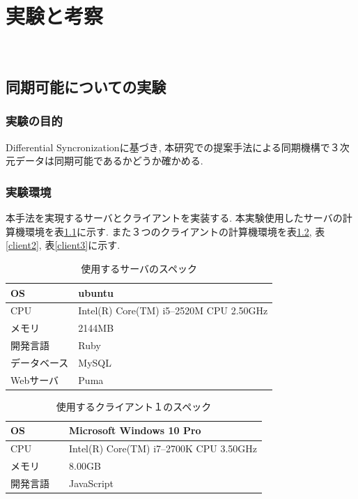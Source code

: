 \chapter{実験と考察}　\label{chap:test}
\section{同期可能についての実験}
\subsection{実験の目的}
Differential Syncronizationに基づき, 本研究での提案手法による同期機構で３次元データは同期可能であるかどうか確かめる.
\subsection{実験環境}
本手法を実現するサーバとクライアントを実装する. 本実験使用したサーバの計算機環境を表\ref{server}に示す. また３つのクライアントの計算機環境を表\ref{client1}, 表\ref{client2}, 表\ref{client3}に示す.
\begin{table}[htbp]
\begin{center}
	\caption{使用するサーバのスペック}
	\begin{tabular}{|l|l|} \hline
		OS & ubuntu \\ \hline
		CPU &  Intel(R) Core(TM) i5--2520M CPU 2.50GHz\\ \hline
		メモリ & 2144MB \\ \hline
    開発言語　& Ruby \\ \hline
		データベース & MySQL \\ \hline
		Webサーバ & Puma\\ \hline
	\end{tabular}
	\label{server}
\end{center}
\end{table}

\begin{table}[htbp]
\begin{center}
	\caption{使用するクライアント１のスペック}
	\begin{tabular}{|l|l|} \hline
		OS & Microsoft Windows 10 Pro \\ \hline
		CPU & Intel(R) Core(TM) i7--2700K CPU 3.50GHz \\ \hline
		メモリ & 8.00GB \\ \hline
    開発言語　& JavaScript \\ \hline
	\end{tabular}
	\label{client1}
\end{center}
\end{table}

